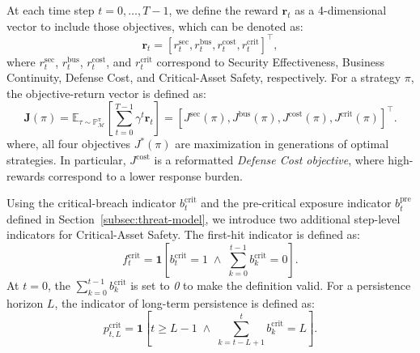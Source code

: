 \documentclass[sigconf,review,anonymous]{acmart}
\begin{document}
At each time step \(t=0,\ldots,T-1\), we define the reward \(\mathbf{r}_{t}\) as a 4-dimensional vector to include those objectives, which can be denoted as:
\begin{equation}
\mathbf{r}_t
=
\left[
r_t^{\mathrm{sec}},
r_t^{\mathrm{bus}},
r_t^{\mathrm{cost}},
r_t^{\mathrm{crit}}
\right]^\top ,
\label{eq:reward-vector}
\end{equation}
where \(r_t^{\mathrm{sec}}\), \(r_t^{\mathrm{bus}}\),
\(r_t^{\mathrm{cost}}\), and \(r_t^{\mathrm{crit}}\) correspond to
Security Effectiveness, Business Continuity, Defense Cost, and
Critical-Asset Safety, respectively. For a strategy \(\pi\), the
objective-return vector is defined as:
\begin{equation}
\mathbf{J}(\pi)
=
\mathbb{E}_{\tau\sim\mathbb{P}_{\mathcal{M}}^\pi}
\left[
\sum_{t=0}^{T-1}
\gamma^t
\mathbf{r}_t
\right]
=
\left[
J^{\mathrm{sec}}(\pi),
J^{\mathrm{bus}}(\pi),
J^{\mathrm{cost}}(\pi),
J^{\mathrm{crit}}(\pi)
\right]^\top .
\label{eq:return-vector}
\end{equation}
where, all four objectives \(J^{\mathrm{*}}(\pi)\) are maximization in generations of optimal strategies. In particular, \(J^{\mathrm{cost}}\) is a reformatted \emph{Defense Cost objective}, where high-rewards correspond to a lower response burden.

Using the critical-breach indicator \(b_t^{\mathrm{crit}}\) and the
pre-critical exposure indicator \(b_t^{\mathrm{pre}}\) defined in
Section~\ref{subsec:threat-model}, we introduce two additional
step-level indicators for Critical-Asset Safety. The first-hit indicator is defined as:
\begin{equation}
f_t^{\mathrm{crit}}
=
\mathbf{1}\!\left[
b_t^{\mathrm{crit}}=1
\;\wedge\;
\sum_{k=0}^{t-1} b_k^{\mathrm{crit}}=0
\label{eq:first-critical-hit}
\right].
\end{equation}
At \(t=0\), the \(\sum_{k=0}^{t-1} b_k^{\mathrm{crit}}\) is set to \emph{0} to make the  definition valid.
For a persistence horizon \(L\), the indicator of long-term persistence is defined as:
\begin{equation}
p_{t,L}^{\mathrm{crit}}
=
\mathbf{1}\!\left[
t\geq L-1
\;\wedge\;
\sum_{k=t-L+1}^{t}
b_k^{\mathrm{crit}}
=
L
\right].
\label{eq:persistent-step}
\end{equation}
\end{document}
